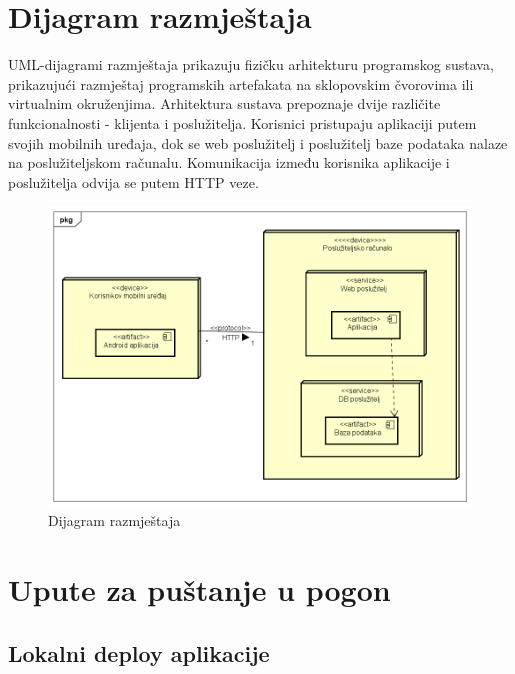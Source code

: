 			\eject 
		
		
		\section{Dijagram razmještaja}
			
			UML-dijagrami razmještaja prikazuju fizičku arhitekturu programskog sustava, prikazujući razmještaj programskih artefakata na sklopovskim čvorovima ili virtualnim okruženjima. Arhitektura sustava prepoznaje dvije različite funkcionalnosti - klijenta i poslužitelja. Korisnici pristupaju aplikaciji putem svojih mobilnih uređaja, dok se web poslužitelj i poslužitelj baze podataka nalaze na poslužiteljskom računalu. Komunikacija između korisnika aplikacije i poslužitelja odvija se putem HTTP veze.
			
			 \begin{figure}[H]
			 	\includegraphics[scale=0.6]{dijagrami/dijagramRazmjestaja/dijagramRazmjestaja.PNG} %
			 	\centering
			 	\caption{Dijagram razmještaja}
			 	\label{fig:dRazmjestaja}
			 \end{figure}
			
			\eject 
		
		\section{Upute za puštanje u pogon}
		
		\subsection{Lokalni deploy aplikacije}
		
